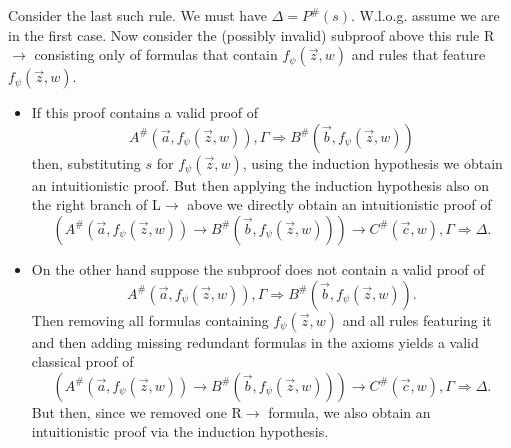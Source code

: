 \documentclass[a4paper,11pt]{report}
\theoremstyle{definition}
\theoremstyle{definition}
\theoremstyle{definition}
\theoremstyle{definition}
\theoremstyle{definition}
\theoremstyle{definition}
\theoremstyle{definition}
\begin{document}
	Consider the last such rule. We must have $\Delta = P^\#(s)$.  W.l.o.g. assume we are in the first case.  Now consider the (possibly invalid) subproof above this rule R$\to$ consisting only of formulas that contain $f_\psi(\vec z, w)$ and rules that feature $f_\psi(\vec z, w)$.
	\begin{itemize}
		\item If this proof contains a valid proof of $$A^\#(\vec a, f_\psi(\vec z, w)),\Gamma\Rightarrow B^\#(\vec b, f_\psi(\vec z, w))$$ then, substituting $s$ for $f_\psi(\vec z, w)$, using the induction hypothesis we obtain an intuitionistic proof. But then applying the induction hypothesis also on the right branch of L$\to$ above we directly obtain an intuitionistic proof of $$(A^\#(\vec a, f_\psi(\vec z, w))\to B^\#(\vec b, f_\psi(\vec z, w)))\to C^\#(\vec c, w), \Gamma\Rightarrow \Delta.$$
		\item  On the other hand suppose the subproof does not contain a valid proof of 
		$$A^\#(\vec a, f_\psi(\vec z, w)),\Gamma\Rightarrow B^\#(\vec b, f_\psi(\vec z, w)).$$Then removing all formulas containing $f_\psi(\vec z, w)$ and all rules featuring it and then adding missing redundant formulas in the axioms yields a valid classical proof of $$(A^\#(\vec a, f_\psi(\vec z, w))\to B^\#(\vec b, f_\psi(\vec z, w)))\to C^\#(\vec c, w), \Gamma\Rightarrow \Delta.$$ But then, since we removed one R$\to$ formula, we also obtain an intuitionistic proof via the induction hypothesis.
	\end{itemize}
\end{document}
